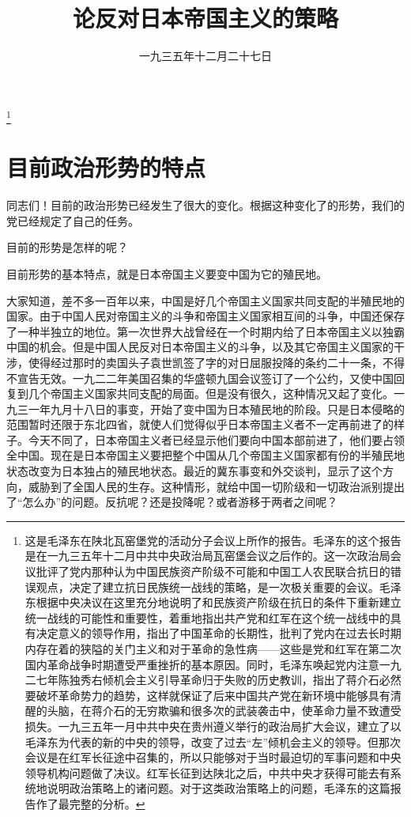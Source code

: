 
\title{论反对日本帝国主义的策略}
\date{一九三五年十二月二十七日}
\thanks{这是毛泽东在陕北瓦窑堡党的活动分子会议上所作的报告。毛泽东的这个报告是在一九三五年十二月中共中央政治局瓦窑堡会议之后作的。这一次政治局会议批评了党内那种认为中国民族资产阶级不可能和中国工人农民联合抗日的错误观点，决定了建立抗日民族统一战线的策略，是一次极关重要的会议。毛泽东根据中央决议在这里充分地说明了和民族资产阶级在抗日的条件下重新建立统一战线的可能性和重要性，着重地指出共产党和红军在这个统一战线中的具有决定意义的领导作用，指出了中国革命的长期性，批判了党内在过去长时期内存在着的狭隘的关门主义和对于革命的急性病——这些是党和红军在第二次国内革命战争时期遭受严重挫折的基本原因。同时，毛泽东唤起党内注意一九二七年陈独秀右倾机会主义引导革命归于失败的历史教训，指出了蒋介石必然要破坏革命势力的趋势，这样就保证了后来中国共产党在新环境中能够具有清醒的头脑，在蒋介石的无穷欺骗和很多次的武装袭击中，使革命力量不致遭受损失。一九三五年一月中共中央在贵州遵义举行的政治局扩大会议，建立了以毛泽东为代表的新的中央的领导，改变了过去“左”倾机会主义的领导。但那次会议是在红军长征途中召集的，所以只能够对于当时最迫切的军事问题和中央领导机构问题做了决议。红军长征到达陕北之后，中共中央才获得可能去有系统地说明政治策略上的诸问题。对于这类政治策略上的问题，毛泽东的这篇报告作了最完整的分析。}
\maketitle


\section{目前政治形势的特点}

同志们！目前的政治形势已经发生了很大的变化。根据这种变化了的形势，我们的党已经规定了自己的任务。

目前的形势是怎样的呢？

目前形势的基本特点，就是日本帝国主义要变中国为它的殖民地。

大家知道，差不多一百年以来，中国是好几个帝国主义国家共同支配的半殖民地的国家。由于中国人民对帝国主义的斗争和帝国主义国家相互间的斗争，中国还保存了一种半独立的地位。第一次世界大战曾经在一个时期内给了日本帝国主义以独霸中国的机会。但是中国人民反对日本帝国主义的斗争，以及其它帝国主义国家的干涉，使得经过那时的卖国头子袁世凯签了字的对日屈服投降的条约二十一条，不得不宣告无效。一九二二年美国召集的华盛顿九国会议签订了一个公约，又使中国回复到几个帝国主义国家共同支配的局面。但是没有很久，这种情况又起了变化。一九三一年九月十八日的事变，开始了变中国为日本殖民地的阶段。只是日本侵略的范围暂时还限于东北四省，就使人们觉得似乎日本帝国主义者不一定再前进了的样子。今天不同了，日本帝国主义者已经显示他们要向中国本部前进了，他们要占领全中国。现在是日本帝国主义要把整个中国从几个帝国主义国家都有份的半殖民地状态改变为日本独占的殖民地状态。最近的冀东事变和外交谈判，显示了这个方向，威胁到了全国人民的生存。这种情形，就给中国一切阶级和一切政治派别提出了“怎么办”的问题。反抗呢？还是投降呢？或者游移于两者之间呢？

